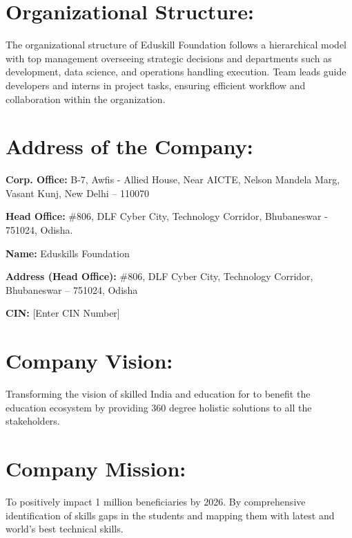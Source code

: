 \documentclass[12pt, a4paper, oneside]{report}
\begin{document}
\section{Organizational Structure:}

The organizational structure of Eduskill Foundation follows a hierarchical model with 
top management overseeing strategic decisions and departments such as development, 
data science, and operations handling execution. Team leads guide developers and 
interns in project tasks, ensuring efficient workflow and collaboration within the 
organization.


\section{Address of the Company:}

\noindent \textbf{Corp. Office:} B-7, Awfis - Allied House, Near AICTE, Nelson Mandela Marg, 
Vasant Kunj, New Delhi -- 110070

\noindent \textbf{Head Office:} \#806, DLF Cyber City, Technology Corridor, 
Bhubaneswar - 751024, Odisha.

\noindent \textbf{Name:} Eduskills Foundation

\noindent \textbf{Address (Head Office):} \#806, DLF Cyber City, Technology Corridor, 
Bhubaneswar -- 751024, Odisha

\noindent \textbf{CIN:} [Enter CIN Number]

\section{Company Vision:}

Transforming the vision of skilled India and education for to benefit the education 
ecosystem by providing 360 degree holistic solutions to all the stakeholders.

\section{Company Mission:}

To positively impact 1 million beneficiaries by 2026.
By comprehensive identification of skills gaps in the students and mapping them with 
latest and world's best technical skills.
\end{document}
